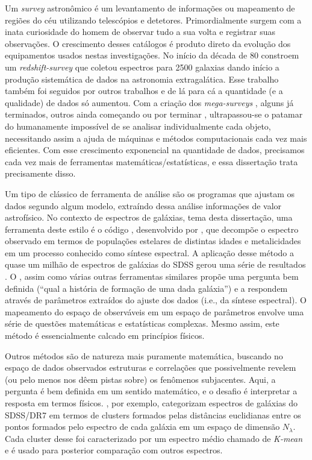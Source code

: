 Um {\em survey} astronômico é um levantamento de informações ou mapeamento de regiões do céu utilizando telescópios e
detetores. Primordialmente surgem com a inata curiosidade do homem de observar tudo a sua volta e registrar suas
observações. O crescimento desses catálogos é produto direto da evolução dos equipamentos usados nestas investigações.
No início da década de 80 \citet{Huchra1983} constroem um {\em redshift-survey} que coletou espectros para 2500 galaxias
dando início a produção sistemática de dados na astronomia extragalática. Esse trabalho também foi seguidos por outros
trabalhos \citep[e.g., ][]{Huchra1988, DaCosta1988} e de lá para cá a quantidade (e a qualidade) de dados só aumentou.
Com a criação dos {\em mega-surveys} \citep[\SDSS, 2dFGRS, 2MASS; ][]{York2000, Colless1999, Skrutskie2006}, alguns já
terminados, outros ainda começando ou por terminar \citep[LSST, JPAS; ][]{Ivezic2008, Benitez2009}, ultrapassou-se o
patamar do humanamente impossível de se analisar individualmente cada objeto, necessitando assim a ajuda de máquinas e
métodos computacionais cada vez mais eficientes. Com esse crescimento exponencial na quantidade de dados, precisamos
cada vez mais de ferramentas matemáticas/estatísticas, e essa dissertação trata precisamente disso.

Um tipo de clássico de ferramenta de análise são os programas que ajustam os dados segundo algum modelo, extraíndo dessa
análise informações de valor astrofísico. No contexto de espectros de galáxias, tema desta dissertação, uma ferramenta
deste estilo é o código \starlight, desenvolvido por \citet{CidFernandes2005}, que decompõe o espectro observado em
termos de populações estelares de distintas idades e metalicidades em um processo conhecido como síntese espectral.
A aplicação desse método a quase um milhão de espectros de galáxias do SDSS gerou uma série de resultados \citep[e.g.,
][]{Asari2007, Asari2009, CidFernandes2007, Mateus2007}. O \starlight, assim como várias outras ferramentas similares
\citep{Panter2003, Gallazzi2005, Ocvirk2006} propõe uma pergunta bem definida (``qual a história de formação de
uma dada galáxia'') e a respondem através de parâmetros extraídos do ajuste dos dados (i.e., da síntese espectral). O
mapeamento do espaço de observáveis em um espaço de parâmetros envolve uma série de questões matemáticas e estatísticas
complexas. Mesmo assim, este método é essencialmente calcado em princípios físicos.

Outros métodos são de natureza mais puramente matemática, buscando no espaço de dados observados estruturas e
correlações que possivelmente revelem (ou pelo menos nos dêem pistas sobre) os fenômenos subjacentes. Aqui, a pergunta é
bem definida em um sentido matemático, e o desafio é interpretar a resposta em termos físicos.
\citet{SanchezAlmeida2010}, por exemplo, categorizam espectros de galáxias do SDSS/DR7 em termos de clusters formados
pelas distâncias euclidianas entre os pontos formados pelo espectro de cada galáxia em um espaço de dimensão
$N_\lambda$. Cada cluster desse foi caracterizado por um espectro médio chamado de {\em K-mean} e é usado para posterior
comparação com outros espectros. 

